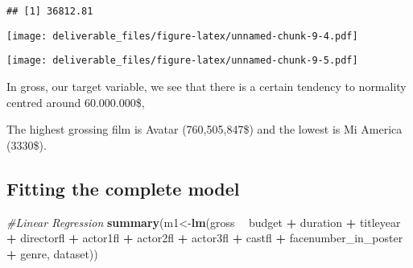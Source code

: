 \documentclass[]{article}
\newenvironment{Shaded}{\begin{snugshade}}{\end{snugshade}}
\newcommand{\KeywordTok}[1]{\textcolor[rgb]{0.13,0.29,0.53}{\textbf{#1}}}
\newcommand{\DataTypeTok}[1]{\textcolor[rgb]{0.13,0.29,0.53}{#1}}
\newcommand{\DecValTok}[1]{\textcolor[rgb]{0.00,0.00,0.81}{#1}}
\newcommand{\StringTok}[1]{\textcolor[rgb]{0.31,0.60,0.02}{#1}}
\newcommand{\CommentTok}[1]{\textcolor[rgb]{0.56,0.35,0.01}{\textit{#1}}}
\newcommand{\OperatorTok}[1]{\textcolor[rgb]{0.81,0.36,0.00}{\textbf{#1}}}
\newcommand{\NormalTok}[1]{#1}
\begin{document}
\begin{verbatim}
## [1] 36812.81
\end{verbatim}

\begin{Shaded}
\end{Shaded}

\texttt{[image: deliverable\_files/figure-latex/unnamed-chunk-9-4.pdf]}

\begin{Shaded}
\end{Shaded}

\texttt{[image: deliverable\_files/figure-latex/unnamed-chunk-9-5.pdf]}

In gross, our target variable, we see that there is a certain tendency
to normality centred around 60.000.000\$,

The highest grossing film is Avatar (760,505,847\$) and the lowest is Mi
America (3330\$).

\subsection{Fitting the complete
model}\label{fitting-the-complete-model}

\begin{Shaded}
\begin{Highlighting}[]
\CommentTok{#Linear Regression}
\KeywordTok{summary}\NormalTok{(m1<-}\KeywordTok{lm}\NormalTok{(gross }\OperatorTok{~}\StringTok{ }\NormalTok{budget }\OperatorTok{+}\StringTok{ }\NormalTok{duration }\OperatorTok{+}\StringTok{ }\NormalTok{titleyear }\OperatorTok{+}\StringTok{ }\NormalTok{directorfl }\OperatorTok{+}\StringTok{ }\NormalTok{actor1fl }\OperatorTok{+}\StringTok{ }\NormalTok{actor2fl }\OperatorTok{+}\StringTok{ }\NormalTok{actor3fl }\OperatorTok{+}\StringTok{ }\NormalTok{castfl }\OperatorTok{+}\StringTok{ }\NormalTok{facenumber_in_poster }\OperatorTok{+}\StringTok{ }\NormalTok{genre, dataset))}
\end{Highlighting}
\end{Shaded}
\end{document}
